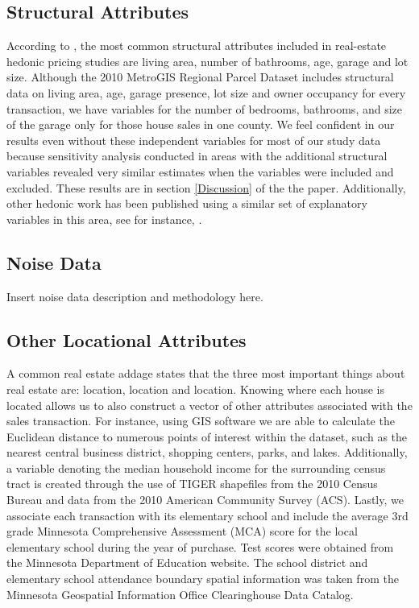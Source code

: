 \documentclass{article}\usepackage{graphicx, color}
\begin{document}
\subsection{Structural Attributes}
According to \cite{Wilhelmsson2000}, the most common structural attributes included in real-estate hedonic pricing studies are living area, number of bathrooms, age, garage and lot size.  Although the 2010 MetroGIS Regional Parcel Dataset includes structural data on living area, age, garage presence, lot size and owner occupancy for every transaction, we have variables for the number of bedrooms, bathrooms, and size of the garage only for those house sales in one county. We feel confident in our results even without these independent variables for most of our study data because sensitivity analysis conducted in areas with the additional structural variables revealed very similar estimates when the variables were included and excluded. These results are in section \ref{Discussion} of the the paper. Additionally, other hedonic work has been published using a similar set of explanatory variables in this area, see for instance, \citet{Sander2009b}.

\subsection{Noise Data}
Insert noise data description and methodology here. \citet{Nega2012}

\subsection{Other Locational Attributes}
A common real estate addage states that the three most important things about real estate are: location, location and location. Knowing where each house is located allows us to also construct a vector of other attributes associated with the sales transaction. For instance, using GIS software we are able to calculate the Euclidean distance to numerous points of interest within the dataset, such as the nearest central business district, shopping centers, parks, and lakes. Additionally, a variable denoting the median household income for the surrounding census tract is created through the use of TIGER shapefiles from the 2010 Census Bureau and data from the 2010 American Community Survey (ACS). Lastly, we associate each transaction with its elementary school and include the average 3rd grade Minnesota Comprehensive Assessment (MCA) score for the local elementary school during the year of purchase. Test scores were obtained from the Minnesota Department of Education website. The school district and elementary school attendance boundary spatial information was taken from the Minnesota Geospatial Information Office Clearinghouse Data Catalog. 
\end{document}
